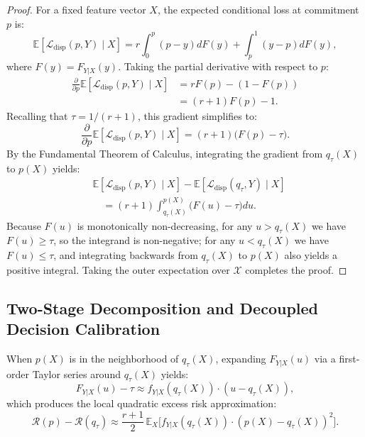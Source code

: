 \begin{proof}
For a fixed feature vector $X$, the expected conditional loss at commitment $p$ is:
\begin{equation}
\mathbb{E}[ \mathcal{L}_{\text{disp}}(p, Y) \mid X ] = r \int_0^p (p - y) dF(y) + \int_p^1 (y - p) dF(y),
\end{equation}
where $F(y) = F_{Y|X}(y)$. Taking the partial derivative with respect to $p$:
\begin{equation}
\begin{split}
\frac{\partial}{\partial p} \mathbb{E}[ \mathcal{L}_{\text{disp}}(p, Y) \mid X ] &= r F(p) - (1 - F(p)) \\
&= (r + 1) F(p) - 1.
\end{split}
\end{equation}
Recalling that $\tau = 1 / (r+1)$, this gradient simplifies to:
\begin{equation}
\frac{\partial}{\partial p} \mathbb{E}[ \mathcal{L}_{\text{disp}}(p, Y) \mid X ] = (r + 1) \Big( F(p) - \tau \Big).
\end{equation}
By the Fundamental Theorem of Calculus, integrating the gradient from $q_\tau(X)$ to $p(X)$ yields:
\begin{equation}
\begin{split}
&\mathbb{E}[ \mathcal{L}_{\text{disp}}(p, Y) \mid X ] - \mathbb{E}[ \mathcal{L}_{\text{disp}}(q_\tau, Y) \mid X ] \\
&\quad = (r+1) \int_{q_\tau(X)}^{p(X)} \Big( F(u) - \tau \Big) du.
\end{split}
\end{equation}
Because $F(u)$ is monotonically non-decreasing, for any $u > q_\tau(X)$ we have $F(u) \ge \tau$, so the integrand is non-negative; for any $u < q_\tau(X)$ we have $F(u) \le \tau$, and integrating backwards from $q_\tau(X)$ to $p(X)$ also yields a positive integral. Taking the outer expectation over $\mathcal{X}$ completes the proof.
\end{proof}

\subsection{Two-Stage Decomposition and Decoupled Decision Calibration}
When $p(X)$ is in the neighborhood of $q_\tau(X)$, expanding $F_{Y|X}(u)$ via a first-order Taylor series around $q_\tau(X)$ yields:
\begin{equation}
F_{Y|X}(u) - \tau \approx f_{Y|X}(q_\tau(X)) \cdot (u - q_\tau(X)),
\end{equation}
which produces the local quadratic excess risk approximation:
\begin{equation}
\mathcal{R}(p) - \mathcal{R}(q_\tau) \approx \frac{r+1}{2} \, \mathbb{E}_X \big[ f_{Y|X}(q_\tau(X)) \cdot ( p(X) - q_\tau(X) )^2 \big].
\label{eq:quadratic_approx}
\end{equation}

